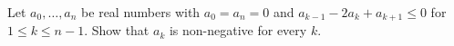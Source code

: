 Let $a_0, \ldots, a_n$ be real numbers with $a_0 = a_n = 0$ and $a_{k-1} - 2a_k + a_{k+1} \leq 0$ for $1 \leq k \leq n - 1$. Show that $a_k$ is non-negative for every $k$.

